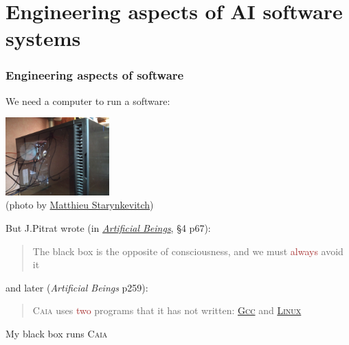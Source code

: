 \documentclass[xcolor=svgnames,final,smaller,a4]{beamer}
\begin{document}
 \section{Engineering aspects of AI software systems}
 \label{sec:engineering-ai}
 
 \begin{frame}
   \frametitle{Engineering aspects of software}

   We need a computer to run a software:

   \begin{center}
     \includegraphics[width=0.3\textwidth]{black-box-computer-small}\\
     (photo by \href{http://matthieu-starynkevitch.com/}{Matthieu Starynkevitch})
   \end{center}

   But J.Pitrat wrote (in \href{https://onlinelibrary.wiley.com/doi/book/10.1002/9780470611791}{\textit{Artificial Beings}}, §4 p67):
   \begin{quote}
     The black box is the opposite of consciousness, and we must \textcolor{brown}{always} avoid it
   \end{quote}
   and later (\textit{Artificial Beings} p259):
     \begin{quote}
       \textsc{Caia} uses \textcolor{brown}{two} programs that it has not written: \href{http://gcc.gnu.org/}{\textsc{Gcc}} and \href{https://https://en.wikipedia.org/wiki/Linux}{\textsc{Linux}}
     \end{quote}
     
   {}

   My black box runs \textsc{Caia} {\large \smiley{}}
 \end{frame}
\end{document}

